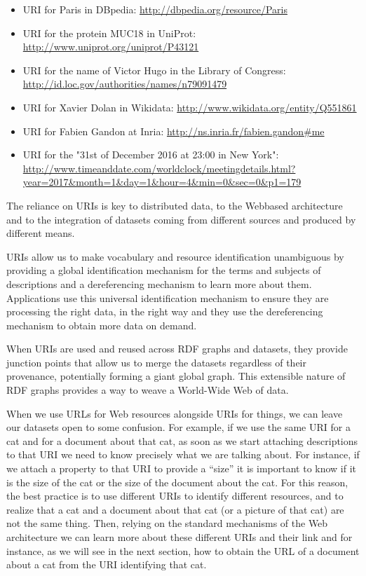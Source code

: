 \begin{itemize}
\item
  URI for Paris in DBpedia: \url{http://dbpedia.org/resource/Paris}
\item
  URI for the protein MUC18 in UniProt:
  \url{http://www.uniprot.org/uniprot/P43121}
\item
  URI for the name of Victor Hugo in the Library of Congress:
  \url{http://id.loc.gov/authorities/names/n79091479}
\item
  URI for Xavier Dolan in Wikidata:
  \url{http://www.wikidata.org/entity/Q551861}
\item
  URI for Fabien Gandon at Inria:
  \url{http://ns.inria.fr/fabien.gandon\#me}
\item
  URI for the "31st of December 2016 at 23:00 in New York":
  \url{http://www.timeanddate.com/worldclock/meetingdetails.html?year=2017\&month=1\&day=1\&hour=4\&min=0\&sec=0\&p1=179}
\end{itemize}

The reliance on URIs is key to distributed data, to the Web\-based
architecture and to the integration of datasets coming from different
sources and produced by different means.

URIs  allow us to make  vocabulary and  resource
identification unambiguous by providing a global identification
mechanism for the terms and subjects of descriptions and a dereferencing
mechanism to learn more about them. Applications use this universal
identification mechanism to ensure they are processing the right data,
in the right way and they use the dereferencing mechanism to obtain more
data on demand.

When URIs are used and reused across RDF graphs and datasets, they
provide junction points that allow us to merge the datasets regardless
of their provenance, potentially forming a  giant global graph. This
extensible nature of RDF graphs provides a way to weave a World-Wide Web
of data.

When we use URLs for Web resources alongside URIs for things, we can
leave our datasets open to some confusion. For example, if we use the
same URI for a cat and for a document about that cat, as soon as we
start attaching descriptions to that URI we need to know precisely what
we are talking about. For instance, if we attach a property to that URI
to provide a ``size'' it is important to know if it is the size of the
cat or the size of the document about the cat. For this reason, the best
practice is to use different URIs to identify different resources, and
to realize that a cat and a document about that cat (or a picture of
that cat) are not the same thing. Then, relying on the standard
mechanisms of the Web architecture we can learn more about these
different URIs and their link and for instance, as we will see in the
next section, how to obtain the URL of a document about a cat from the
URI identifying that cat.

